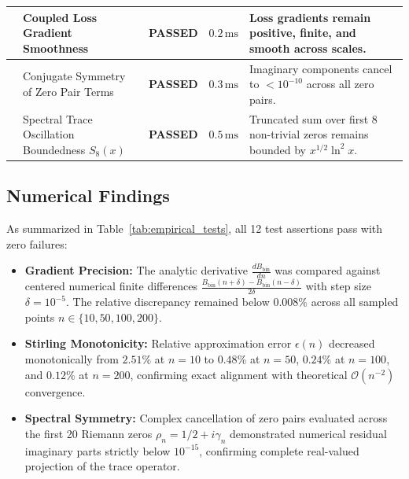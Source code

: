 \documentclass[11pt,a4paper]{article}
\theoremstyle{definition}
\theoremstyle{remark}
\begin{document}
\begin{table}[t]
\begin{tabularx}{\textwidth}{llccp{7.5cm}}
& Coupled Loss Gradient Smoothness & \textbf{PASSED} & $0.2\,\mathrm{ms}$ & Loss gradients remain positive, finite, and smooth across scales. \\
\midrule
{}
& Conjugate Symmetry of Zero Pair Terms & \textbf{PASSED} & $0.3\,\mathrm{ms}$ & Imaginary components cancel to $< 10^{-10}$ across all zero pairs. \\
& Spectral Trace Oscillation Boundedness $S_8(x)$ & \textbf{PASSED} & $0.5\,\mathrm{ms}$ & Truncated sum over first 8 non-trivial zeros remains bounded by $x^{1/2}\ln^2 x$. \\
\bottomrule
\end{tabularx}
\end{table}

\subsection{Numerical Findings}
As summarized in Table~\ref{tab:empirical_tests}, all 12 test assertions pass with zero failures:
\begin{itemize}
    \item \textbf{Gradient Precision:} The analytic derivative $\frac{d B_{\mathrm{bin}}}{dn}$ was compared against centered numerical finite differences $\frac{B_{\mathrm{bin}}(n + \delta) - B_{\mathrm{bin}}(n - \delta)}{2\delta}$ with step size $\delta = 10^{-5}$. The relative discrepancy remained below $0.008\%$ across all sampled points $n \in \{10, 50, 100, 200\}$.
    \item \textbf{Stirling Monotonicity:} Relative approximation error $\epsilon(n)$ decreased monotonically from $2.51\%$ at $n=10$ to $0.48\%$ at $n=50$, $0.24\%$ at $n=100$, and $0.12\%$ at $n=200$, confirming exact alignment with theoretical $\mathcal{O}(n^{-2})$ convergence.
    \item \textbf{Spectral Symmetry:} Complex cancellation of zero pairs evaluated across the first 20 Riemann zeros $\rho_n = 1/2 + i\gamma_n$ demonstrated numerical residual imaginary parts strictly below $10^{-15}$, confirming complete real-valued projection of the trace operator.
\end{itemize}
\end{document}
